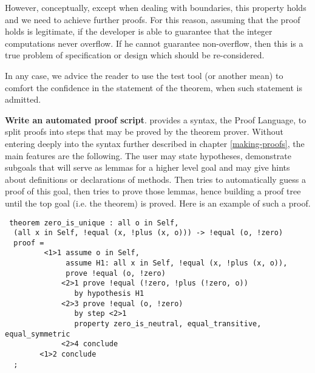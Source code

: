 \begin{compact-itemize}
\begin{compact-itemize}

        \vspace{0.1cm}
        However, conceptually, except when dealing with boundaries,
        this property holds and we need to achieve further proofs. For
        this reason, assuming that the proof holds is legitimate, if the
        developer is able to guarantee that the integer computations
        never overflow. If he cannot guarantee non-overflow, then this
        is a true problem of specification or design which should be
        re-considered.
    \end{compact-itemize}

In any case,  we advice the reader to use
the test tool (or another mean) to comfort the confidence in the
statement of the theorem, when such statement is admitted.

\item {\bf Write an automated proof script}.  {\focal} provides a
  syntax, the {\focal} Proof Language, to split proofs into steps that
  may be proved by the {\zenon} theorem prover. Without entering deeply
  into the syntax further described in chapter \ref{making-proofs},
  the main features are the following. The user may state hypotheses,
  demonstrate subgoals that will serve as lemmas for a higher level
  goal and may give hints about definitions or declarations of
  methods. Then {\zenon} tries to automatically guess a proof of this
  goal, then tries to prove those lemmas, hence building a proof tree
  until the top goal (i.e. the theorem) is proved. Here is an
  example of such a proof.

 {\scriptsize
\begin{lstlisting}
 theorem zero_is_unique : all o in Self,
  (all x in Self, !equal (x, !plus (x, o))) -> !equal (o, !zero)
  proof =
         <1>1 assume o in Self,
              assume H1: all x in Self, !equal (x, !plus (x, o)),
              prove !equal (o, !zero)
             <2>1 prove !equal (!zero, !plus (!zero, o))
                by hypothesis H1
             <2>3 prove !equal (o, !zero)
                by step <2>1
                property zero_is_neutral, equal_transitive, equal_symmetric
             <2>4 conclude
        <1>2 conclude
  ;
\end{lstlisting}}


\end{compact-itemize}
